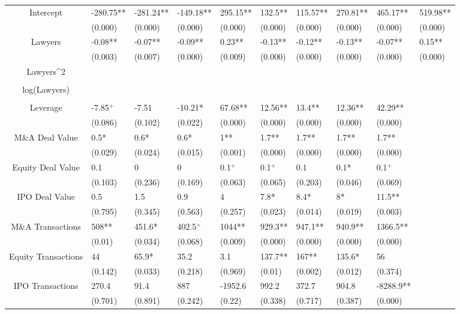 \documentclass{article}
\begin{document}
\begin{table}[H]
\begin{tabular}{|clllllllll|}
Intercept & -280.75** & -281.24** & -149.18** & 295.15** & 132.5** & 115.57** & 270.81** & 465.17** & 519.98** \\ 
   & (0.000) & (0.000) & (0.000) & (0.000) & (0.000) & (0.000) & (0.000) & (0.000) & (0.000) \\ 
  Lawyers & -0.08** & -0.07** & -0.09** & 0.23** & -0.13** & -0.12** & -0.13** & -0.07** & 0.15** \\ 
   & (0.003) & (0.007) & (0.000) & (0.009) & (0.000) & (0.000) & (0.000) & (0.000) & (0.000) \\ 
  Lawyers^2 &  &  &  &  &  &  &  &  &  \\ 
   &  &  &  &  &  &  &  &  &  \\ 
  log(Lawyers) &  &  &  &  &  &  &  &  &  \\ 
   &  &  &  &  &  &  &  &  &  \\ 
  Leverage & -7.85$^{+}$ & -7.51 & -10.21* & 67.68** & 12.56** & 13.4** & 12.36** & 42.29** &  \\ 
   & (0.086) & (0.102) & (0.022) & (0.000) & (0.000) & (0.000) & (0.000) & (0.000) &  \\ 
  M\&A Deal Value & 0.5* & 0.6* & 0.6* & 1** & 1.7** & 1.7** & 1.7** & 1.7** &  \\ 
   & (0.029) & (0.024) & (0.015) & (0.001) & (0.000) & (0.000) & (0.000) & (0.000) &  \\ 
  Equity Deal Value & 0.1 & 0 & 0 & 0.1$^{+}$ & 0.1$^{+}$ & 0.1 & 0.1* & 0.1$^{+}$ &  \\ 
   & (0.103) & (0.236) & (0.169) & (0.063) & (0.065) & (0.203) & (0.046) & (0.069) &  \\ 
  IPO Deal Value & 0.5 & 1.5 & 0.9 & 4 & 7.8* & 8.4* & 8* & 11.5** &  \\ 
   & (0.795) & (0.345) & (0.563) & (0.257) & (0.023) & (0.014) & (0.019) & (0.003) &  \\ 
  M\&A Transactions & 508** & 451.6* & 402.5$^{+}$ & 1044** & 929.3** & 947.1** & 940.9** & 1366.5** &  \\ 
   & (0.01) & (0.034) & (0.068) & (0.009) & (0.000) & (0.000) & (0.000) & (0.000) &  \\ 
  Equity Transactions & 44 & 65.9* & 35.2 & 3.1 & 137.7** & 167** & 135.6* & 56 &  \\ 
   & (0.142) & (0.033) & (0.218) & (0.969) & (0.01) & (0.002) & (0.012) & (0.374) &  \\ 
  IPO Transactions & 270.4 & 91.4 & 887 & -1952.6 & 992.2 & 372.7 & 904.8 & -8288.9** &  \\ 
   & (0.701) & (0.891) & (0.242) & (0.22) & (0.338) & (0.717) & (0.387) & (0.000) &  \\ 

\end{tabular}
\end{table}
\end{document}
